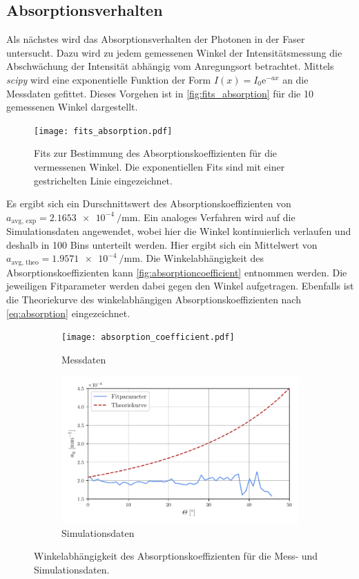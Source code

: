 \subsection{Absorptionsverhalten}
Als nächstes wird das Absorptionsverhalten der Photonen in der Faser untersucht.  
Dazu wird zu jedem gemessenen Winkel der Intensitätsmessung die Abschwächung der Intensität abhängig vom Anregungsort betrachtet. Mittels \textit{scipy} \cite{scipy}
wird eine exponentielle Funktion der Form $I(x) = I_0 \mathrm{e}^{-ax}$ an die Messdaten gefittet. Dieses Vorgehen ist in \autoref{fig:fits_absorption} für die 10 gemessenen Winkel 
dargestellt.
\begin{figure}
  \centering
  \texttt{[image: fits\_absorption.pdf]}
  \caption{Fits zur Bestimmung des Absorptionskoeffizienten für die vermessenen Winkel. Die exponentiellen Fits sind mit einer gestrichelten Linie eingezeichnet.}
  \label{fig:fits_absorption}
\end{figure}
Es ergibt sich ein Durschnittswert des Absorptionskoeffizienten von $a_\text{avg, exp} = \qty{2.1653e-4}{\per\milli\metre}$.
Ein analoges Verfahren wird auf die Simulationsdaten angewendet, wobei hier die Winkel kontinuierlich verlaufen und deshalb in 100 Bins unterteilt werden. 
Hier ergibt sich ein Mittelwert von  $a_\text{avg, theo} = \qty{1.9571e-4}{\per\milli\metre}$.
Die Winkelabhängigkeit des Absorptionskoeffizienten kann \autoref{fig:absorptioncoefficient} entnommen werden. Die jeweiligen Fitparameter werden dabei gegen den Winkel aufgetragen.
Ebenfalls ist die Theoriekurve des winkelabhängigen Absorptionskoeffizienten nach \autoref{eq:absorption} eingezeichnet.
\begin{figure}
  \centering
  \begin{subfigure}{.7\textwidth}
    \texttt{[image: absorption\_coefficient.pdf]}
    \caption{Messdaten}
    \label{fig:absorptioncoefficient_data}
  \end{subfigure}
  \hfill
  \begin{subfigure}{.7\textwidth}
    \includegraphics[width = \textwidth]{content/pics/absorption_sim2.pdf}
    \caption{Simulationsdaten}
    \label{fig:absorptioncoefficient_sim}
  \end{subfigure}
  \caption{Winkelabhängigkeit des Absorptionskoeffizienten für die Mess- und Simulationsdaten.}
  \label{fig:absorptioncoefficient}
\end{figure}

